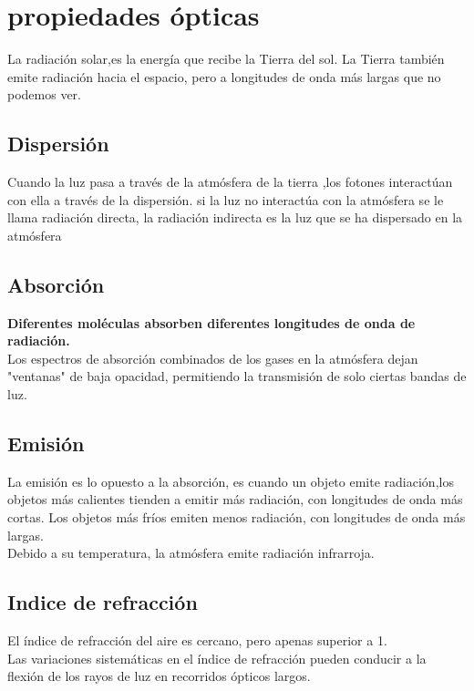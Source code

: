 \documentclass{article}
\begin{document}
\section{propiedades ópticas}
La radiación solar,es la energía que recibe la Tierra del sol. La Tierra también emite radiación hacia el espacio, pero a longitudes de onda más largas que no podemos ver.
\subsection{Dispersión}
Cuando la luz pasa a través de la atmósfera de la tierra ,los fotones interactúan con ella a través de la dispersión. si la luz no interactúa con la atmósfera se le llama radiación directa, la radiación indirecta es la luz que se ha dispersado en la atmósfera
\subsection{Absorción}
\textbf{Diferentes moléculas absorben diferentes longitudes de onda de radiación.}\\
Los espectros de absorción combinados de los gases en la atmósfera dejan "ventanas" de baja opacidad, permitiendo la transmisión de solo ciertas bandas de luz.
\subsection{Emisión}
La emisión es lo opuesto a la absorción, es cuando un objeto emite radiación,los objetos más calientes tienden a emitir más radiación, con longitudes de onda más cortas. Los objetos más fríos emiten menos radiación, con longitudes de onda más largas.\\
Debido a su temperatura, la atmósfera emite radiación infrarroja. 
\subsection{Indice de refracción}
El índice de refracción del aire es cercano, pero apenas superior a 1. \\Las variaciones sistemáticas en el índice de refracción pueden conducir a la flexión de los rayos de luz en recorridos ópticos largos.
\end{document}

